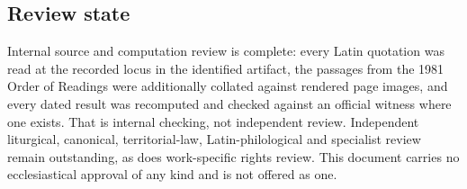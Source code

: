 \subsection{Review state}

Internal source and computation review is complete: every Latin quotation was read at the recorded
locus in the identified artifact, the passages from the 1981 Order of Readings were additionally
collated against rendered page images, and every dated result was recomputed and checked against an
official witness where one exists. That is internal checking, not independent review. Independent
liturgical, canonical, territorial-law, Latin-philological and specialist review remain outstanding,
as does work-specific rights review. This document carries no ecclesiastical approval of any kind and
is not offered as one.
